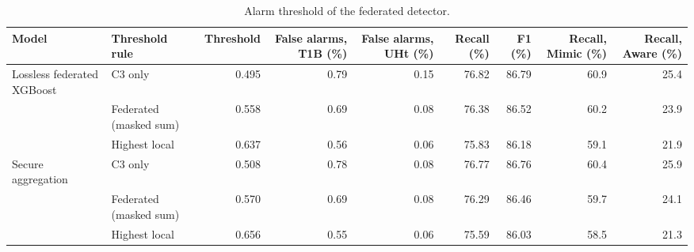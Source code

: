 \begin{table}[t]
\centering
\caption{Alarm threshold of the federated detector.}
\label{tab:threshold}
\small
\begin{tabular}{llrrrrrrr}
\toprule
Model & Threshold rule & Threshold & False alarms, T1B (\%) & False alarms, UHt (\%) & Recall (\%) & F1 (\%) & Recall, Mimic (\%) & Recall, Aware (\%) \\
\midrule
Lossless federated XGBoost & C3 only & 0.495 & 0.79 & 0.15 & 76.82 & 86.79 & 60.9 & 25.4 \\
 & Federated (masked sum) & 0.558 & 0.69 & 0.08 & 76.38 & 86.52 & 60.2 & 23.9 \\
 & Highest local & 0.637 & 0.56 & 0.06 & 75.83 & 86.18 & 59.1 & 21.9 \\
\midrule
Secure aggregation & C3 only & 0.508 & 0.78 & 0.08 & 76.77 & 86.76 & 60.4 & 25.9 \\
 & Federated (masked sum) & 0.570 & 0.69 & 0.08 & 76.29 & 86.46 & 59.7 & 24.1 \\
 & Highest local & 0.656 & 0.55 & 0.06 & 75.59 & 86.03 & 58.5 & 21.3 \\
\bottomrule
\end{tabular}
\end{table}
